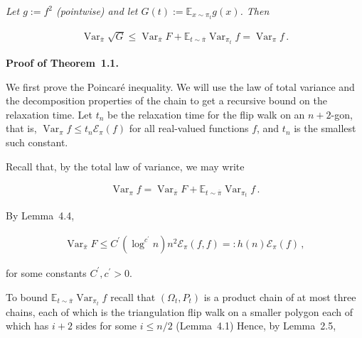 \emph{Let $g:=f^{2}$ (pointwise) and let $G(t):=\mathbb{E}_{x\sim\pi_{t}}g(x)$. Then}\par




\[\begin{gathered}
\operatorname{Var}_{\bar{\pi}}\sqrt{G}\leq\operatorname{Var}_{\bar{\pi}}F+\mathbb{E}_{t\sim\bar{\pi}}\operatorname{Var}_{\pi_{t}}f=\operatorname{Var}_{\pi}f\,.
\end{gathered}\]






\par\medskip\noindent\textbf{Proof of Theorem 1.1.}\par



We first prove the Poincaré inequality. We will use the law of total variance and the decomposition properties of the chain to get a recursive bound on the relaxation time. Let $t_{n}$ be the relaxation time for the flip walk on an $n+2$-gon, that is, $\operatorname{Var}_{\pi}f\leq t_{n}\mathcal{E}_{\pi}(f)$ for all real-valued functions $f$, and $t_{n}$ is the smallest such constant.\par




Recall that, by the total law of variance, we may write\par


\[\begin{gathered}
\operatorname{Var}_{\pi}f=\operatorname{Var}_{\overline{\pi}}F+\mathbb{E}_{t\sim\overline{\pi}}\operatorname{Var}_{\pi_{t}}f\,.
\end{gathered}\]


By Lemma 4.4,\par


\[\begin{gathered}
\operatorname{Var}_{\overline{\pi}}F\leq C^{\prime}(\log^{c^{\prime}}n)n^{2}\mathcal{E}_{\pi}(f,f)=:h(n)\mathcal{E}_{\pi}(f)\,,
\end{gathered}\]


for some constants $C^{\prime},c^{\prime}>0$.\par




To bound $\mathbb{E}_{t\sim\overline{\pi}}\operatorname{Var}_{\pi_{t}}f$ recall that $(\Omega_{t},P_{t})$ is a product chain of at most three chains, each of which is the triangulation flip walk on a smaller polygon each of which has $i+2$ sides for some $i\leq n/2$ (Lemma 4.1)
Hence, by Lemma 2.5,\par


